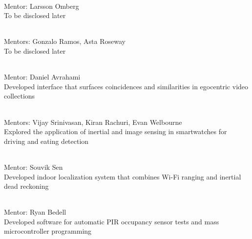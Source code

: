  \\
Mentor: Larsson Omberg \\
To be disclosed later
\vspace{5pt}

 \\
Mentors: Gonzalo Ramos, Asta Roseway \\
To be disclosed later
\vspace{5pt}

 \\
Mentor: Daniel Avrahami \\
Developed interface that surfaces coincidences and similarities in egocentric video collections
\vspace{5pt}

 \\
Mentors: Vijay Srinivasan, Kiran Rachuri, Evan Welbourne \\
Explored the application of inertial and image sensing in smartwatches for driving and eating detection
\vspace{5pt}

 \\
Mentor: Souvik Sen \\
Developed indoor localization system that combines Wi-Fi ranging and inertial dead reckoning
\vspace{5pt}

 \\
Mentor: Ryan Bedell \\
Developed software for automatic PIR occupancy sensor tests and mass microcontroller programming